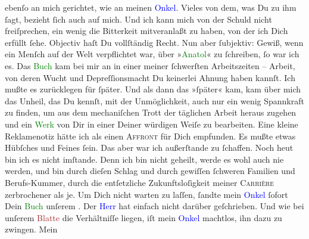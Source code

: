                   {\pb}ebenſo an mich gerichtet, wie an meinen \textcolor{blue}{Onkel}{}. Vieles von dem, was Du
               zu ihm ſagt, bezieht ſich auch auf mich. Und ich kann mich von der Schuld nicht
               freiſprechen, ein wenig die Bitterkeit mitveranlaßt zu haben, von der ich Dich
               erfüllt ſehe. Objectiv haſt Du vollſtändig Recht. Nun aber ſubjektiv: Gewiß, wenn ein
               Menſch auf der Welt verpflichtet war, über »\textcolor{green}{Anatol}{}\ledrightnote{\textcolor{green}{Anatol}}« zu ſchreiben, ſo war ich es. Das \textcolor{green}{Buch}{} kam bei mir an in einer meiner ſchwerſten Arbeitszeiten
               – Arbeit, von deren Wucht und Depreſ{\pb}ſionsmacht Du
               keinerlei Ahnung haben kannſt. Ich mußte es zurücklegen für ſpäter. Und als dann das
               »ſpäter« kam, kam über mich das Unheil, das Du kennſt, mit der Unmöglichkeit, auch
               nur ein wenig Spannkraft zu finden, um aus dem mechaniſchen Trott der täglichen
               Arbeit heraus zugehen und \strikeout{\textcolor{gray}{×}} ein \textcolor{green}{Werk}{} von Dir in
               einer Deiner würdigen Weiſe zu bearbeiten. Eine kleine Reklamenotiz hätte ich als
               einen \textsc{Affront} für Dich empfunden. Es mußte etwas Hübſches
               und Feines {\pb}ſein. Das aber war ich außerſtande zu
               ſchaffen. Noch heut bin ich es nicht imſtande. Denn
               ich bin nicht geheilt, werde es wohl auch nie werden, und bin durch dieſen Schlag und
               durch gewiſſen ſchweren Familien und Berufs-Kummer, durch die entſetzliche
               Zukunftsloſigkeit meiner \textsc{Carrière} zerbrochener als je. Um
               Dich nicht warten zu laſſen, ſandte mein \textcolor{blue}{Onkel}{} ſofort Dein \textcolor{green}{Buch}{} unſerem \label{K_L02709-5v}\label{K_L02709-5h}. Der \textcolor{blue}{Herr}{} hat einfach nicht darüber geſchrieben. Und wie {\pb}bei unſerem \textcolor{brown}{Blatte}{} die Verhältniſſe liegen, iſt mein \textcolor{blue}{Onkel}{} machtlos, ihn dazu zu zwingen. Mein
